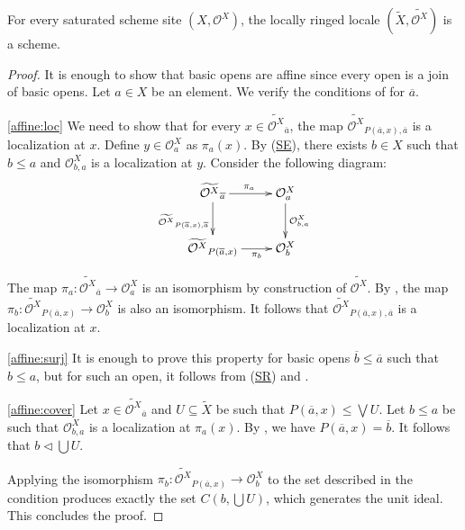 \documentclass[reqno]{amsart}
\newcommand{\axref}[1]{(\hyperref[ax:#1]{#1})}
\theoremstyle{definition}
\theoremstyle{remark}
\numberwithin{figure}{section}
\newcommand{\cover}{\triangleleft}
\begin{document}
\begin{prop}
For every saturated scheme site $(X,\mathcal{O}^X)$, the locally ringed locale $(\widetilde{X},\widetilde{\mathcal{O}^X})$ is a scheme.
\end{prop}
\begin{proof}
It is enough to show that basic opens are affine since every open is a join of basic opens.
Let $a \in X$ be an element.
We verify the conditions of  for $\overline{a}$.

\eqref{affine:loc}
We need to show that for every $x \in \widetilde{\mathcal{O}^X}_{\overline{a}}$,
the map $\widetilde{\mathcal{O}^X}_{P(\overline{a},x),\overline{a}}$ is a localization at $x$.
Define $y \in \mathcal{O}^X_a$ as $\pi_a(x)$.
By \axref{SE}, there exists $b \in X$ such that $b \leq a$ and $\mathcal{O}^X_{b,a}$ is a localization at $y$.
Consider the following diagram:
\[ \xymatrix{ \widetilde{\mathcal{O}^X}_{\overline{a}} \ar[r]^{\pi_a} \ar[d]_{\widetilde{\mathcal{O}^X}_{P(\overline{a},x),\overline{a}}} & \mathcal{O}^X_a \ar[d]^{\mathcal{O}^X_{b,a}} \\
              \widetilde{\mathcal{O}^X}_{P(\overline{a},x)} \ar[r]_-{\pi_b}                                                               & \mathcal{O}^X_b
            } \]

The map $\pi_a : \widetilde{\mathcal{O}^X}_{\overline{a}} \to \mathcal{O}^X_a$ is an isomorphism by construction of $\widetilde{\mathcal{O}^X}$.
By , the map $\pi_b : \widetilde{\mathcal{O}^X}_{P(\overline{a},x)} \to \mathcal{O}^X_b$ is also an isomorphism.
It follows that $\widetilde{\mathcal{O}^X}_{P(\overline{a},x),\overline{a}}$ is a localization at $x$.

\eqref{affine:surj}
It is enough to prove this property for basic opens $\overline{b} \leq \overline{a}$ such that $b \leq a$,
but for such an open, it follows from \axref{SR} and .

\eqref{affine:cover}
Let $x \in \widetilde{\mathcal{O}^X}_{\overline{a}}$ and $U \subseteq \widetilde{X}$ be such that $P(\overline{a},x) \leq \bigvee U$.
Let $b \leq a$ be such that $\mathcal{O}^X_{b,a}$ is a localization at $\pi_a(x)$.
By , we have $P(\overline{a},x) = \overline{b}$.
It follows that $b \cover \bigcup U$.

Applying the isomorphism $\pi_b : \widetilde{\mathcal{O}^X}_{P(\overline{a},x)} \to \mathcal{O}^X_b$
to the set described in the condition produces exactly the set $C(b, \bigcup U)$, which generates the unit ideal.
This concludes the proof.
\end{proof}
\end{document}
